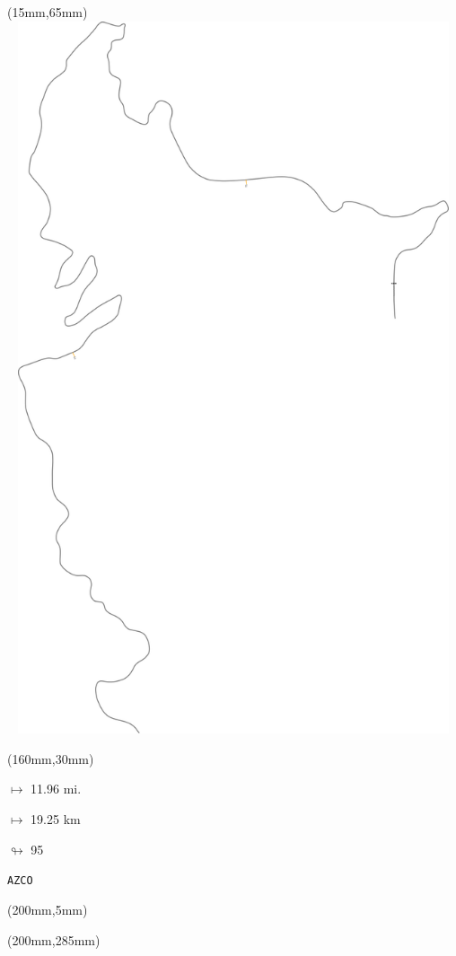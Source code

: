 \begin{textblock*}{185mm}(15mm,65mm)%
\centering
\mbox{\includegraphics[width=185mm,height=210mm,keepaspectratio]{PT/AZCO.pdf}}
\end{textblock*}
\begin{textblock*}{40mm}(160mm,30mm)%
\Large
\par$\mapsto$ 11.96 mi.
\par$\mapsto$ 19.25 km
\par$\looparrowright$ 95
\par\hfill\tiny\tt AZCO\\
\end{textblock*}
\begin{textblock*}{20mm}(200mm,5mm)%
\fbox{\thepage}
\label{AZCO}
\end{textblock*}
\begin{textblock*}{20mm}(200mm,285mm)%
\fbox{\thepage}
\end{textblock*}


